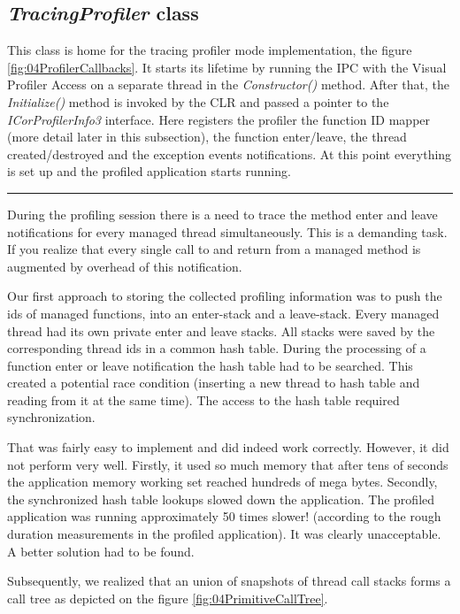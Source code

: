 \subsection{\textit{TracingProfiler} class}
This class is home for the tracing profiler mode implementation, the figure \ref{fig:04ProfilerCallbacks}. It starts its lifetime by running the IPC with the Visual Profiler Access on a separate thread in the \textit{Constructor()} method. After that, the \textit{Initialize()} method is invoked by the CLR and passed a pointer to the \textit{ICorProfilerInfo3} interface. Here registers the profiler the function ID mapper (more detail later in this subsection), the function enter/leave, the thread created/destroyed and the exception events notifications. At this point everything is set up and the profiled application starts running.

\begin{center}
\rule{300pt}{1.5pt}
\end{center}
During the profiling session there is a need to trace the method enter and leave notifications for every managed thread simultaneously. This is a demanding task. If you realize that every single call to and return from a managed method is augmented by overhead of this notification. 

Our first approach to storing the collected profiling information was to push the ids of managed functions, into an enter-stack and a leave-stack. Every managed thread had its own private enter and leave stacks. All stacks were saved by the corresponding thread ids in a common hash table. During the processing of a function enter or leave notification the hash table had to be searched. This created a potential race condition (inserting a new thread to hash table and reading from it at the same time). The access to the hash table required synchronization.

That was fairly easy to implement and did indeed work correctly. However, it did not perform very well. Firstly, it used so much memory that after tens of seconds the application memory working set reached hundreds of mega bytes. Secondly, the synchronized hash table lookups slowed down the application. The profiled application was running approximately 50 times slower! (according to the rough duration measurements in the profiled application). It was clearly unacceptable. A better solution had to be found. 

Subsequently, we realized that an union of snapshots of thread call stacks forms a call tree as depicted on the figure \ref{fig:04PrimitiveCallTree}.


